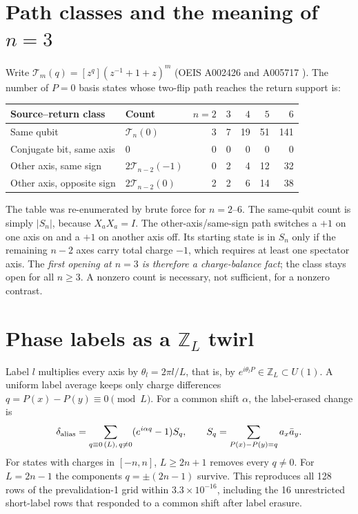 \documentclass[11pt,a4paper]{article}
\newcommand{\T}{\mathcal T}
\begin{document}
\section*{Path classes and the meaning of $n=3$}
Write $\T_m(q)=[z^q](z^{-1}+1+z)^m$ (OEIS A002426 and A005717 \cite{oeis}). The number of $P=0$ basis states whose two-flip path reaches the return support is:
\begin{center}\small
\begin{tabular}{@{}l l r r r r r@{}}
\toprule
Source--return class & Count & $n=2$ & $3$ & $4$ & $5$ & $6$\\
\midrule
Same qubit & $\T_n(0)$ & 3 & 7 & 19 & 51 & 141\\
Conjugate bit, same axis & $0$ & 0 & 0 & 0 & 0 & 0\\
Other axis, same sign & $2\T_{n-2}(-1)$ & 0 & 2 & 4 & 12 & 32\\
Other axis, opposite sign & $2\T_{n-2}(0)$ & 2 & 2 & 6 & 14 & 38\\
\bottomrule
\end{tabular}
\end{center}
The table was re-enumerated by brute force for $n=2$--$6$. The same-qubit count is simply $|S_n|$, because $X_aX_a=I$. The other-axis/same-sign path switches a $+1$ on one axis on and a $+1$ on another axis off. Its starting state is in $S_n$ only if the remaining $n-2$ axes carry total charge $-1$, which requires at least one spectator axis. The \emph{first opening at $n=3$ is therefore a charge-balance fact}; the class stays open for all $n\ge3$. A nonzero count is necessary, not sufficient, for a nonzero contrast.

\section*{Phase labels as a $\mathbb Z_L$ twirl}
Label $l$ multiplies every axis by $\theta_l=2\pi l/L$, that is, by $e^{i\theta_lP}\in\mathbb Z_L\subset U(1)$. A uniform label average keeps only charge differences $q=P(x)-P(y)\equiv0\pmod L$. For a common shift $\alpha$, the label-erased change is
\begin{equation}
 \delta_{\rm alias}=\sum_{q\equiv0\,(L),\,q\neq0}(e^{i\alpha q}-1)S_q,\qquad S_q=\sum_{P(x)-P(y)=q}a_x\bar a_y .
\end{equation}
For states with charges in $[-n,n]$, $L\ge2n+1$ removes every $q\neq0$. For $L=2n-1$ the components $q=\pm(2n-1)$ survive. This reproduces all 128 rows of the prevalidation-1 grid within $3.3\times10^{-16}$, including the 16 unrestricted short-label rows that responded to a common shift after label erasure.
\end{document}
